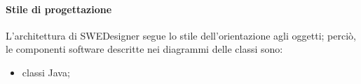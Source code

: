 \paragraph{Stile di progettazione} L’architettura di SWEDesigner segue lo
stile dell’orientazione agli oggetti; perciò, le componenti software descritte
nei diagrammi delle classi sono:
\begin{itemize}
\item classi Java;
\end{itemize}

